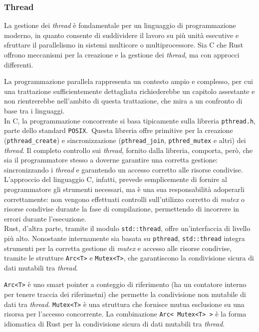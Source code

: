 \subsubsection{Thread}
La gestione dei \textit{thread} è fondamentale per un linguaggio di programmazione moderno, in quanto consente di suddividere il lavoro su più unità esecutive e sfruttare
il parallelismo in sistemi multicore o multiprocessore. 
Sia C che Rust
offrono meccanismi per la creazione e la gestione dei \textit{thread}, ma con approcci differenti. 

La programmazione parallela rappresenta un contesto ampio e complesso, per cui una 
trattazione sufficientemente dettagliata richiederebbe un capitolo assestante e non rientrerebbe nell'ambito di questa trattazione, che mira a un confronto di base tra i linguaggi. \hfill
\vspace{10pt}\\
\noindent In C, la programmazione concorrente si basa tipicamente sulla libreria \texttt{pthread.h}, parte dello standard \texttt{POSIX}.\ 
Questa libreria offre primitive per la creazione (\texttt{pthread\_create}) e sincronizzazione (\texttt{pthread\_join}, \texttt{pthred\_mutex} e altri) dei \textit{thread}.
Il completo controllo sui \textit{thread}, fornito dalla libreria, comporta, però, che sia il programmatore stesso a doverne garantire una corretta gestione: sincronizzando i \textit{thread} e
garantendo un accesso corretto alle risorse condivise. 
L'approccio del linguaggio C, infatti, prevede semplicemente di fornire al programmatore gli strumenti
necessari, ma è una sua responsabilità adoperarli correttamente: non vengono effettuati controlli sull'utilizzo corretto di \textit{mutex} o risorse condivise durante la fase 
di compilazione, permettendo di incorrere in errori durante l'esecuzione. \hfill
\vspace{10pt}\\
\noindent Rust, d'altra parte, tramite il modulo \texttt{std::thread}, offre un'interfaccia di livello più alto. 
Nonostante internamente sia basata su \texttt{pthread}, \texttt{std::thread} integra strumenti per la corretta gestione di \textit{mutex} e accesso alle risorse condivise, tramite
le strutture \texttt{Arc<T>} e \texttt{Mutex<T>}, che garantiscono la condivisione sicura di dati mutabili tra \textit{thread}.

\texttt{Arc<T>} è uno smart pointer a conteggio di riferimento (ha un contatore interno per tenere traccia dei riferimetni) che permette la condivisione non mutabile di dati tra \textit{thread}.
\texttt{Mutex<T>} è una struttura che fornisce mutua esclusione su una risorsa per l'accesso concorrente.
La combinazione \texttt{Arc< Mutex<T\textgreater\ >} è la forma idiomatica di Rust per la condivisione sicura di dati mutabili tra \textit{thread}.

